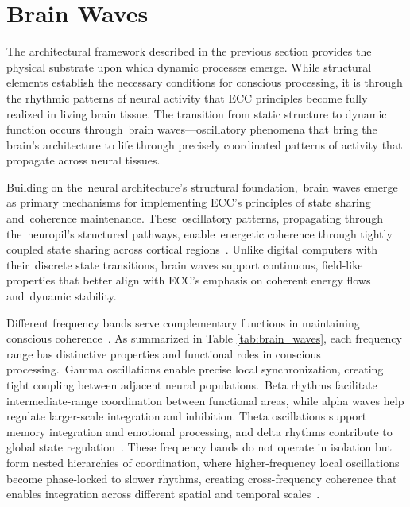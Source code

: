 \section{Brain Waves~}

The architectural framework described in the previous section provides the physical substrate upon which dynamic processes emerge. While structural elements establish the necessary conditions for conscious processing, it is through the rhythmic patterns of neural activity that ECC principles become fully realized in living brain tissue. The transition from static structure to dynamic function occurs through~brain waves—oscillatory phenomena that bring the brain's architecture to life through precisely coordinated patterns of activity that propagate across neural tissues.

Building on the~neural architecture's structural foundation,~brain waves emerge as primary mechanisms for implementing ECC's principles of state sharing and~coherence maintenance. These~oscillatory patterns, propagating through the~neuropil's structured pathways, enable~energetic coherence through tightly coupled state sharing across cortical regions~\cite{Buzsaki2004, Buzsaki2006}. Unlike digital computers with their~discrete state transitions, brain waves support continuous, field-like properties that better align with ECC's emphasis on coherent energy flows and~dynamic stability.

Different frequency bands serve complementary functions in maintaining conscious coherence~\cite{Wang2010, Basar2013}. As summarized in Table \ref{tab:brain_waves}, each frequency range has distinctive properties and functional roles in conscious processing.~Gamma oscillations enable precise local synchronization, creating tight coupling between adjacent neural populations.~Beta rhythms facilitate intermediate-range coordination between functional areas, while alpha waves help regulate larger-scale integration and inhibition. Theta oscillations support memory integration and emotional processing, and delta rhythms contribute to global state regulation~\cite{Steriade2006, Nyhus2010}. These frequency bands do not operate in isolation but form nested hierarchies of coordination, where higher-frequency local oscillations become phase-locked to slower rhythms, creating cross-frequency coherence that enables integration across different spatial and temporal scales~\cite{Canolty2010, Jensen2007}.

